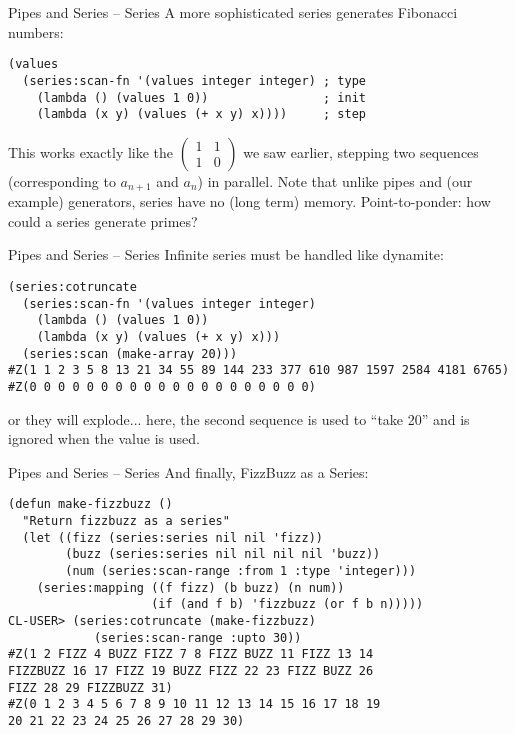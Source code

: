 \documentclass[presentation]{beamer}
\begin{document}
\begin{frame}[fragile]{Pipes and Series -- Series}
  A more sophisticated series generates Fibonacci numbers:
\begin{verbatim}
(values
  (series:scan-fn '(values integer integer) ; type
    (lambda () (values 1 0))                ; init
    (lambda (x y) (values (+ x y) x))))     ; step
\end{verbatim}

\medskip
This works exactly like the $\left(\begin{array}{cc} 1 & 1\\ 1 & 0\end{array}\right)$ we saw earlier, stepping two sequences (corresponding to $a_{n+1}$ and $a_n$) in parallel.
\medskip
Note that unlike pipes and (our example) generators, series have no (long term) memory.  Point-to-ponder: how could a series generate primes?
\end{frame}

\begin{frame}[fragile]{Pipes and Series -- Series}
  Infinite series must be handled like dynamite:
\begin{verbatim}
(series:cotruncate
  (series:scan-fn '(values integer integer)
    (lambda () (values 1 0))
    (lambda (x y) (values (+ x y) x)))
  (series:scan (make-array 20)))
#Z(1 1 2 3 5 8 13 21 34 55 89 144 233 377 610 987 1597 2584 4181 6765)
#Z(0 0 0 0 0 0 0 0 0 0 0 0 0 0 0 0 0 0 0 0)
\end{verbatim}
or they will explode... here, the second sequence is used to ``take 20'' and is ignored when the value is used.
\end{frame}

\begin{frame}[fragile]{Pipes and Series -- Series}
And finally, FizzBuzz as a Series:
\begin{verbatim}
(defun make-fizzbuzz ()
  "Return fizzbuzz as a series"
  (let ((fizz (series:series nil nil 'fizz))
        (buzz (series:series nil nil nil nil 'buzz))
        (num (series:scan-range :from 1 :type 'integer)))
    (series:mapping ((f fizz) (b buzz) (n num))
                    (if (and f b) 'fizzbuzz (or f b n)))))
CL-USER> (series:cotruncate (make-fizzbuzz)
            (series:scan-range :upto 30))
#Z(1 2 FIZZ 4 BUZZ FIZZ 7 8 FIZZ BUZZ 11 FIZZ 13 14
FIZZBUZZ 16 17 FIZZ 19 BUZZ FIZZ 22 23 FIZZ BUZZ 26
FIZZ 28 29 FIZZBUZZ 31)
#Z(0 1 2 3 4 5 6 7 8 9 10 11 12 13 14 15 16 17 18 19
20 21 22 23 24 25 26 27 28 29 30)
\end{verbatim}
\end{frame}
\end{document}

